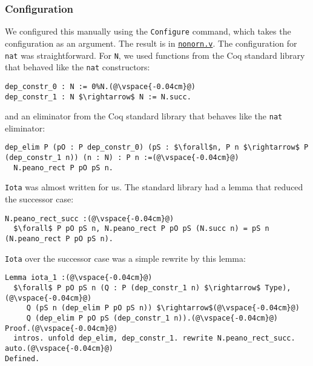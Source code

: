 \subsubsection{Configuration}
We configured this manually using the \lstinline{Configure} command,
which takes the configuration as an argument.
The result is in \href{https://github.com/uwplse/pumpkin-pi/blob/master/plugin/coq/nonorn.v}{\lstinline{nonorn.v}}.
The configuration for \lstinline{nat} was straightforward.
For \lstinline{N}, we used functions from the Coq standard library that
behaved like the \lstinline{nat} constructors:

\begin{lstlisting}
dep_constr_0 : N := 0%N.(@\vspace{-0.04cm}@)
dep_constr_1 : N $\rightarrow$ N := N.succ.
\end{lstlisting}
and an eliminator from the Coq standard library that behaves like the \lstinline{nat} eliminator:

\begin{lstlisting}
dep_elim P (pO : P dep_constr_0) (pS : $\forall$n, P n $\rightarrow$ P (dep_constr_1 n)) (n : N) : P n :=(@\vspace{-0.04cm}@)
  N.peano_rect P pO pS n.
\end{lstlisting}
\lstinline{Iota} was almost written for us.
The standard library had a lemma that reduced the successor case:

\begin{lstlisting}
N.peano_rect_succ :(@\vspace{-0.04cm}@)
  $\forall$ P pO pS n, N.peano_rect P pO pS (N.succ n) = pS n (N.peano_rect P pO pS n).
\end{lstlisting}
\lstinline{Iota} over the successor case was a simple rewrite by this lemma:

\begin{lstlisting}
Lemma iota_1 :(@\vspace{-0.04cm}@)
  $\forall$ P pO pS n (Q : P (dep_constr_1 n) $\rightarrow$ Type),(@\vspace{-0.04cm}@)
     Q (pS n (dep_elim P pO pS n)) $\rightarrow$(@\vspace{-0.04cm}@)
     Q (dep_elim P pO pS (dep_constr_1 n)).(@\vspace{-0.04cm}@)
Proof.(@\vspace{-0.04cm}@)
  intros. unfold dep_elim, dep_constr_1. rewrite N.peano_rect_succ. auto.(@\vspace{-0.04cm}@)
Defined.
\end{lstlisting}

